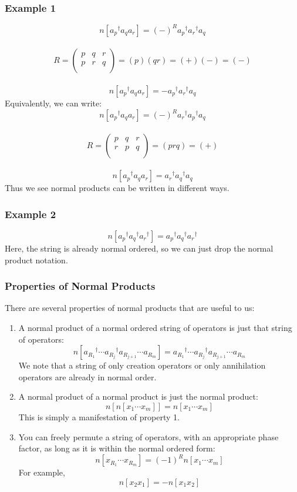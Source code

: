 \documentclass{article}
\newcommand{\dg}{\ensuremath{^\dagger} }
\newcommand{\cd}{\ensuremath{\cdots} }
\begin{document}
\subsubsection{Example 1}
\[n[a_p\dg a_q a_r ] = (-)^R a_p\dg a_r\dg a_q \]\\
\[
R = 
\begin{pmatrix}
p & q & r  \\
p & r & q  \\
\end{pmatrix}
= (p)(qr) = (+)(-) = (-)
\] \\
\[n[a_p\dg a_q a_r ] = - a_p\dg a_r\dg a_q \]
Equivalently, we can write: 
\[n[a_p\dg a_q a_r ] = (-)^R a_r\dg a_p\dg a_q \]\\
\[
R = 
\begin{pmatrix}
p & q & r  \\
r & p & q  \\
\end{pmatrix}
= (prq) = (+) 
\] \\
\[n[a_p\dg a_q a_r ] =  a_r\dg a_q\dg a_q \]
Thus we see normal products can be written in different ways. 
\subsubsection{Example 2}
\[ n[a_p\dg a_q\dg a_r\dg] = a_p\dg a_q\dg a_r\dg \]
Here, the string is already normal ordered, so we can just drop the normal product notation. 
\subsubsection{Properties of Normal Products}
There are several properties of normal products that are useful to us: 
\begin{enumerate}
\item A normal product of a normal ordered string of operators is just that string of operators:
\[n[a_{R_1}\dg \cd a_{R_j}\dg a_{R_{j+1}} \cd a_{R_m} ] = a_{R_1}\dg \cd a_{R_j}\dg a_{R_{j+1}} \cd a_{R_m}  \]
We note that a string of only creation operators or only annihilation operators are already in normal order. 
\item A normal product of a normal product is just the normal product: 
\[n[n[x_1 \cd x_m]] = n[x_1 \cd x_m] \]
This is simply a manifestation of property 1. 
\item You can freely permute a string of operators, with an appropriate phase factor, as long as it is within the normal ordered form:
\[n[x_{R_1} \cd x_{R_m} ] = (-1)^R n[ x_1 \cd x_m]\]
For example,
\[n[x_2 x_1] = -n[x_1 x_2] \]
\end{enumerate}
\end{document}
